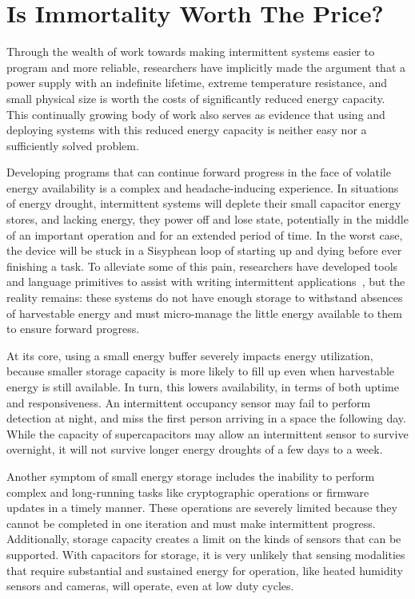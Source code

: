 \iffalse
\section{Is Immortality Worth The Price?}
\label{sec:immortal}

Through the wealth of work towards making intermittent systems easier to
program and more reliable, researchers have implicitly made the argument that a
power supply with an indefinite lifetime, extreme temperature resistance, and
small physical size is worth the costs of significantly
reduced energy capacity. This continually growing body of work
also serves as evidence that
using and deploying systems with this reduced energy capacity is neither
easy nor a sufficiently solved problem.

Developing programs that can continue forward progress in the face of volatile
energy availability is a complex and headache-inducing experience.
In situations of
energy drought, intermittent systems will deplete their small capacitor energy
stores, and lacking energy, they power off and lose state, potentially in the
middle of an important operation and for an extended period of time. In the
worst case, the device will be stuck in a Sisyphean loop of starting up and
dying before ever finishing a task.  To alleviate some of this pain, researchers
have developed tools and language primitives to assist with writing
intermittent applications~\cite{luciaIntermittent17, hesterTimely17}, but the
reality remains: these systems do not have enough storage to withstand
absences of harvestable energy and must micro-manage the little energy
available to them to ensure forward progress.

At its core, using a small energy buffer severely impacts energy utilization, because smaller
storage capacity is more likely to fill up even when harvestable energy is still available. In turn, this
lowers availability, in terms of both uptime and responsiveness.  An
intermittent occupancy sensor may fail to perform detection at night, and miss
the first person arriving in a space the following day. While the capacity of
supercapacitors may allow an intermittent sensor to survive overnight, it will not
survive longer energy droughts of a few days to a week.

Another symptom of small energy storage includes the inability to perform
complex and long-running tasks like cryptographic operations or
firmware updates in a timely manner.
These operations are severely limited
because they cannot be completed in one iteration and must make intermittent
progress.
Additionally, storage capacity creates a limit on the kinds of sensors that can be supported.
With capacitors for storage, it is very unlikely that sensing modalities that require
substantial and sustained energy for operation, like heated humidity sensors and cameras,
will operate, even at low duty cycles.

